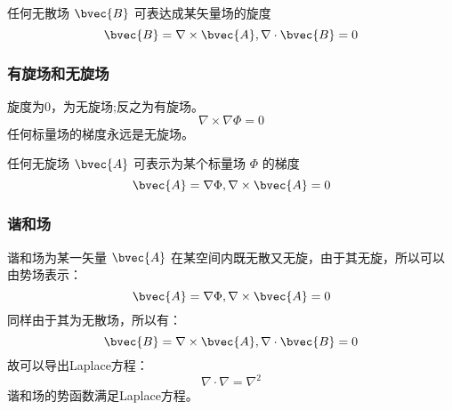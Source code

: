 任何无散场 $\bvec{B}$ 可表达成某矢量场的旋度
\begin{equation}\label{VecAnl_eq25}
\bvec{B}=\nabla\times\bvec{A} ,\nabla\cdot\bvec{B}=0
\end{equation}

\subsubsection{有旋场和无旋场}
旋度为0，为无旋场;反之为有旋场。
\begin{equation}\label{VecAnl_eq26}
\nabla\times\nabla\Phi=0
\end{equation}
任何标量场的梯度永远是无旋场。

任何无旋场 $\bvec{A}$ 可表示为某个标量场 $\Phi$ 的梯度
\begin{equation}\label{VecAnl_eq27}
\bvec{A}=\nabla\Phi,\nabla\times\bvec{A}=0
\end{equation}

\subsubsection{谐和场}
谐和场为某一矢量 $\bvec{A}$ 在某空间内既无散又无旋，由于其无旋，所以可以由势场表示：
\begin{equation}\label{VecAnl_eq28}
\bvec{A}=\nabla\Phi,\nabla\times\bvec{A}=0
\end{equation}
同样由于其为无散场，所以有：
\begin{equation}\label{VecAnl_eq29}
\bvec{B}=\nabla\times\bvec{A} ,\nabla\cdot\bvec{B}=0
\end{equation}
故可以导出Laplace方程：
\begin{equation}\label{VecAnl_eq30}
\nabla\cdot\nabla=\nabla^2
\end{equation}
谐和场的势函数满足Laplace方程。

